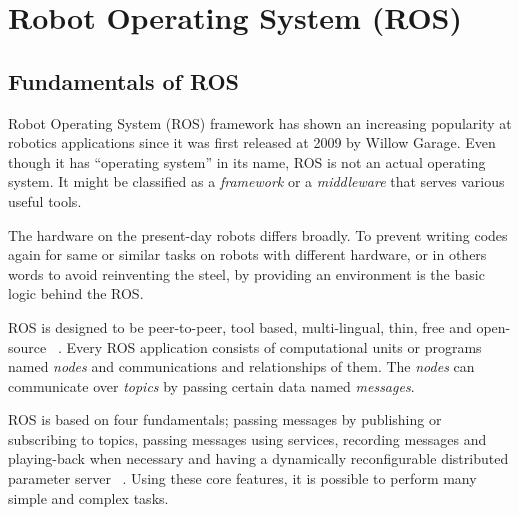 
\chapter{Robot Operating System (ROS)}
\label{chap:ros}

\section{Fundamentals of ROS}
\label{sec:fundamentals of ros}
Robot Operating System (ROS) framework has shown an increasing popularity at robotics applications since it was first released at 2009 by Willow Garage. Even though it has “operating system” in its name, ROS is not an actual operating system. It might be classified as a \textit{framework} or a \textit{middleware} that serves various useful tools. 
\par
The hardware on the present-day robots differs broadly. To prevent writing codes again for same or similar tasks on robots with different hardware, or in others words to avoid reinventing the steel, by providing an environment is the basic logic behind the ROS. 
\par
ROS is designed to be peer-to-peer, tool based, multi-lingual, thin, free and open-source ~\cite{Quigley09}. Every ROS application consists of computational units or programs named \textit{nodes} and communications and relationships of them. The \textit{nodes} can communicate over \textit{topics} by passing certain data named \textit{messages}. 
\par
ROS is based on four fundamentals; passing messages by publishing or subscribing to topics, passing messages using services, recording messages and playing-back when necessary and having a dynamically reconfigurable distributed parameter server ~\cite{rosCoreComponents}. Using these core features, it is possible to perform many simple and complex tasks. 

